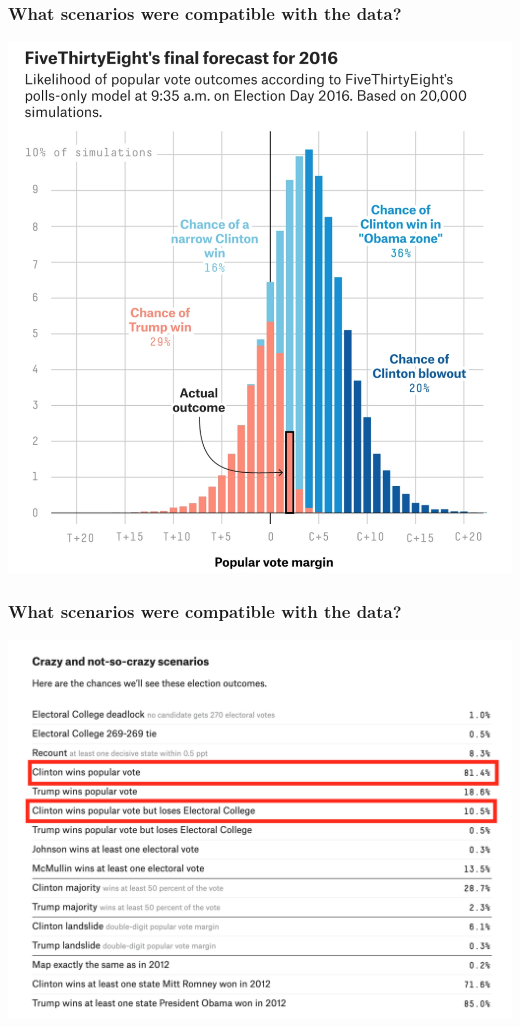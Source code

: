 \documentclass[aspectratio=169]{beamer}
\theoremstyle{principle}
\begin{document}
\begin{frame}
\frametitle{What scenarios were compatible with the data?}
\begin{center}
\includegraphics[scale=0.3]{as-f-popvote.png}
\end{center}

\end{frame}

\begin{frame}
\frametitle{What scenarios were compatible with the data?}
\begin{center}
\includegraphics[scale=0.3]{scenarios.png}
\end{center}

\end{frame}
\end{document}
